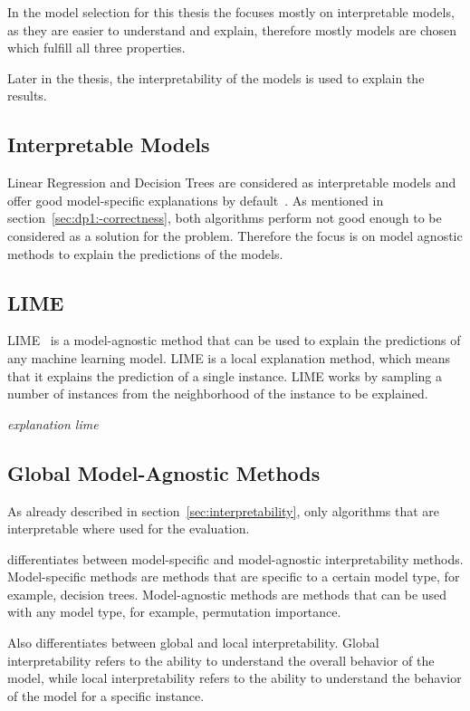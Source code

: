 In the model selection for this thesis the focuses mostly on interpretable models,
as they are easier to understand and explain, therefore mostly models are chosen which fulfill
all three properties.

Later in the thesis, the interpretability of the models is used to explain
the results.

\subsection{Interpretable Models}\label{subsec:interpretable-models}
Linear Regression and Decision Trees are considered as interpretable models and offer good
model-specific explanations by default~\cite{molnar2020interpretable}.
As mentioned in section~\ref{sec:dp1:-correctness}, both algorithms perform not good enough
to be considered as a solution for the problem.
Therefore the focus is on model agnostic methods to explain the predictions of the models.

\subsection{LIME}\label{subsec:lime}
LIME~\cite{ribeiro2016model} is a model-agnostic method that can be used to explain the
predictions of any machine learning model.
LIME is a local explanation method, which means that it explains the prediction of a single
instance.
LIME works by sampling a number of instances from the neighborhood of the instance to be
explained.

\textit{explanation lime }


\subsection*{Global Model-Agnostic Methods}
As already described in section~\ref{sec:interpretability}, only algorithms
that are interpretable where used for the evaluation.

\cite{molnar2020interpretable} differentiates between
model-specific and model-agnostic interpretability methods.
Model-specific methods are methods that are specific to a certain model type, for example,
decision trees.
Model-agnostic methods are methods that can be used with any model type, for
example, permutation importance.

Also \cite{molnar2020interpretable} differentiates between global and local
interpretability. Global
interpretability refers to the ability to understand the overall behavior of
the model, while
local interpretability refers to the ability to understand the behavior of
the model for a
specific instance.

